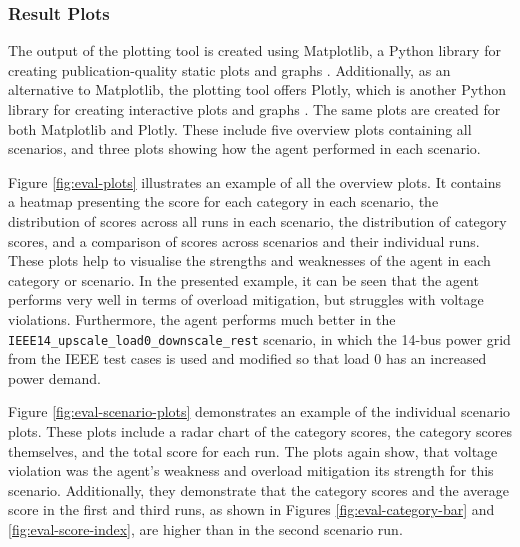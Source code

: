 \subsubsection{Result Plots}
The output of the plotting tool is created using Matplotlib, a Python library for creating publication-quality static plots and graphs \cite{matplotlib}. Additionally, as an alternative to Matplotlib, the plotting tool offers Plotly, which is another Python library for creating interactive plots and graphs \cite{plotly}. The same plots are created for both Matplotlib and Plotly. These include five overview plots containing all scenarios, and three plots showing how the agent performed in each scenario.

Figure \ref{fig:eval-plots} illustrates an example of all the overview plots. It contains a heatmap presenting the score for each category in each scenario, the distribution of scores across all runs in each scenario, the distribution of category scores, and a comparison of scores across scenarios and their individual runs. These plots help to visualise the strengths and weaknesses of the agent in each category or scenario. In the presented example, it can be seen that the agent performs very well in terms of overload mitigation, but struggles with voltage violations. Furthermore, the agent performs much better in the \texttt{IEEE14\_upscale\_load0\_downscale\_rest} scenario, in which the 14-bus power grid from the IEEE test cases is used and modified so that load 0 has an increased power demand.

Figure \ref{fig:eval-scenario-plots} demonstrates an example of the individual scenario plots. These plots include a radar chart of the category scores, the category scores themselves, and the total score for each run. The plots again show, that voltage violation was the agent's weakness and overload mitigation its strength for this scenario. Additionally, they demonstrate that the category scores and the average score in the first and third runs, as shown in Figures \ref{fig:eval-category-bar} and \ref{fig:eval-score-index}, are higher than in the second scenario run.

